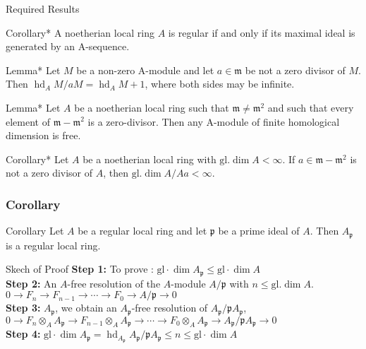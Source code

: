 \documentclass[
	11pt, %
]{beamer}
\newcommand{\B}{\textbf}						%
\begin{document}
\begin{frame}{Required Results}
\small{
\begin{block}{Corollary*}
   A noetherian local ring $A$ is regular if and only if its maximal ideal is generated by an A-sequence.
\end{block}
\begin{block}{Lemma*}
  Let $M$ be a non-zero A-module and let $a \in \mathfrak{m}$ be not a zero divisor of $M$. Then $\operatorname{hd}_{A} M / a M=\operatorname{hd}_{A} M+1$, where both sides may be infinite.
\end{block}
\begin{block}{Lemma*}
   Let $A$ be a noetherian local ring such that $\mathfrak{m} \neq \mathfrak{m}^{2}$ and such that every element of $\mathfrak{m}-\mathfrak{m}^{2}$ is a zero-divisor. Then any A-module of finite homological dimension is free.
\end{block}
\begin{block}{Corollary*}
   Let $A$ be a noetherian local ring with $\mathrm{gl} . \operatorname{dim} A<\infty$. If $a \in \mathfrak{m}-\mathfrak{m}^{2}$ is not a zero divisor of $A$, then $\mathrm{gl} . \operatorname{dim} A / A a<\infty$.
\end{block}
}
\end{frame}

\begin{frame}
\frametitle{Corollary}
\begin{block}{ Corollary }
    Let $A$ be a regular local ring and let $\mathfrak{p}$ be a prime ideal of $A$. Then $A_{\mathfrak{p}}$ is a regular local ring.
\end{block}

\pause
\begin{block}{Skech of Proof}
\B{Step 1:} To prove :
$\mathrm{gl} \cdot \operatorname{dim} A_{\mathfrak{p}} \leq \mathrm{gl} \cdot \operatorname{dim} A$
\\
\B{Step 2:} An $A$-free resolution of the $A$-module $A / \mathfrak{p}$ with $n \leq \mathrm{gl}. \operatorname{dim} A$.
$
0 \rightarrow F_{n} \rightarrow F_{n-1} \rightarrow \cdots \rightarrow F_{0} \rightarrow A / \mathfrak{p} \rightarrow 0
$
\\
\B{Step 3:} $A_{\mathfrak{p}}$, we obtain an $A_{\mathfrak{p}}$-free resolution of $A_{\mathfrak{p}} / \mathfrak{p} A_{\mathfrak{p}}$,
$
0 \rightarrow F_{n} \otimes_{A} A_{\mathfrak{p}} \rightarrow F_{n-1} \otimes_{A} A_{\mathfrak{p}} \rightarrow \cdots \rightarrow F_{0} \otimes_{A} A_{\mathfrak{p}} \rightarrow A_{\mathfrak{p}} / \mathfrak{p} A_{\mathfrak{p}} \rightarrow 0
$
\\
\B{Step 4:} $\mathrm{gl} \cdot \operatorname{dim} A_{\mathfrak{p}}=\operatorname{hd}_{A_{\mathfrak{p}}} A_{\mathfrak{p}} / \mathfrak{p} A_{\mathfrak{p}} \leq n \leq \mathrm{gl} \cdot \operatorname{dim} A$
\end{block}
\end{frame}
\end{document}
